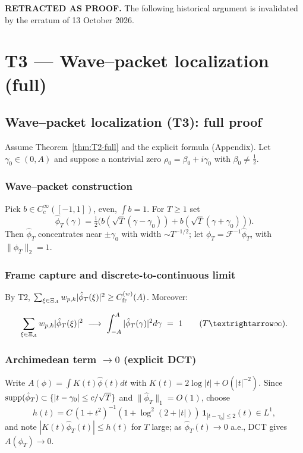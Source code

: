 \par\noindent\textbf{RETRACTED AS PROOF.} The following historical argument is invalidated by the erratum of 13 October 2026.\par
\section{T3 — Wave–packet localization (full)}

\subsection{Wave–packet localization (T3): full proof}\label{sec:T3-full}

Assume Theorem~\ref{thm:T2-full} and the explicit formula (Appendix).
Let $\gamma_0\in(0,A)$ and suppose a nontrivial zero $\rho_0=\beta_0+i\gamma_0$ with $\beta_0\ne \tfrac12$.

\subsubsection{Wave–packet construction}
Pick $b\in C_c^\infty([-1,1])$, even, $\int b=1$. For $T\ge 1$ set
\[
\hat\phi_T(\gamma)=\tfrac12\Big(b(\sqrt{T}(\gamma-\gamma_0))+b(\sqrt{T}(\gamma+\gamma_0))\Big).
\]
Then $\hat\phi_T$ concentrates near $\pm\gamma_0$ with width $\sim T^{-1/2}$; let $\phi_T=\mathcal F^{-1}\hat\phi_T$, with $\|\phi_T\|_2=1$.

\subsubsection{Frame capture and discrete-to-continuous limit}
By T2, $\sum_{\xi\in\Xi_A}w_{p,k}|\hat\phi_T(\xi)|^2\ge C_{\mathrm{fr}}^{(w)}(A)$. Moreover:
\begin{lemma}\label{lem:frame-to-int}
\[
\sum_{\xi\in\Xi_A}\wpk|\hat\phi_T(\xi)|^2 \ \longrightarrow\ \int_{-A}^A |\hat\phi_T(\gamma)|^2 d\gamma \ =\ 1 \qquad (T\to\infty).
\]
\end{lemma}

\subsubsection{\texorpdfstring{Archimedean term $\to 0$ (explicit DCT)}{Archimedean term to 0 (explicit DCT)}}
Write $A(\phi)=\int K(t)\hat\phi(t) dt$ with $K(t)=2\log|t|+O(|t|^{-2})$.
Since $\operatorname{supp}(\hat\phi_T)\subset \{ |t-\gamma_0|\le c/\sqrt{T}\}$ and $\|\hat\phi_T\|_1=O(1)$,
choose
\[
h(t)=C\,(1+t^2)^{-1}(1+\log^2(2+|t|))\,\mathbf 1_{|t-\gamma_0|\le 2}(t)\in L^1,
\]
and note $|K(t)\hat\phi_T(t)|\le h(t)$ for $T$ large; as $\hat\phi_T(t)\to 0$ a.e., DCT gives $A(\phi_T)\to 0$.

